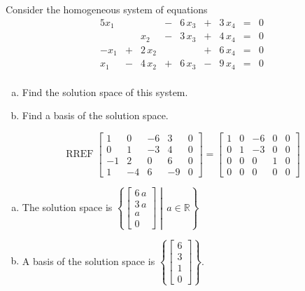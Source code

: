 
\begin{exerciseStatement}


Consider the homogeneous system of equations 
\begin{alignat*}{5} x_{1} & &  &-& 6 \, x_{3} &+& 3 \, x_{4} &=& 0 \\ & & x_{2} &-& 3 \, x_{3} &+& 4 \, x_{4} &=& 0 \\-x_{1} &+& 2 \, x_{2} & &  &+& 6 \, x_{4} &=& 0 \\x_{1} &-& 4 \, x_{2} &+& 6 \, x_{3} &-& 9 \, x_{4} &=& 0 \\ \end{alignat*}
            


\begin{enumerate}[(a)]
\item  Find the solution space of this system.
\item  Find a basis of the solution space.
\end{enumerate}
    
\end{exerciseStatement}
    
\begin{exerciseAnswer} 


\[\operatorname{RREF} \left[\begin{array}{cccc|c}
1 & 0 & -6 & 3 & 0 \\
0 & 1 & -3 & 4 & 0 \\
-1 & 2 & 0 & 6 & 0 \\
1 & -4 & 6 & -9 & 0
\end{array}\right] = \left[\begin{array}{cccc|c}
1 & 0 & -6 & 0 & 0 \\
0 & 1 & -3 & 0 & 0 \\
0 & 0 & 0 & 1 & 0 \\
0 & 0 & 0 & 0 & 0
\end{array}\right] \]


\begin{enumerate}[(a)]
\item The solution space is \( \left\{ \left[\begin{array}{c}
6 \, a \\
3 \, a \\
a \\
0
\end{array}\right] \middle|\,a\in\mathbb{R}\right\} \)
\item A basis of the solution space is \( \left\{ \left[\begin{array}{c}
6 \\
3 \\
1 \\
0
\end{array}\right] \right\} \).
\end{enumerate}
    
\end{exerciseAnswer}
    
